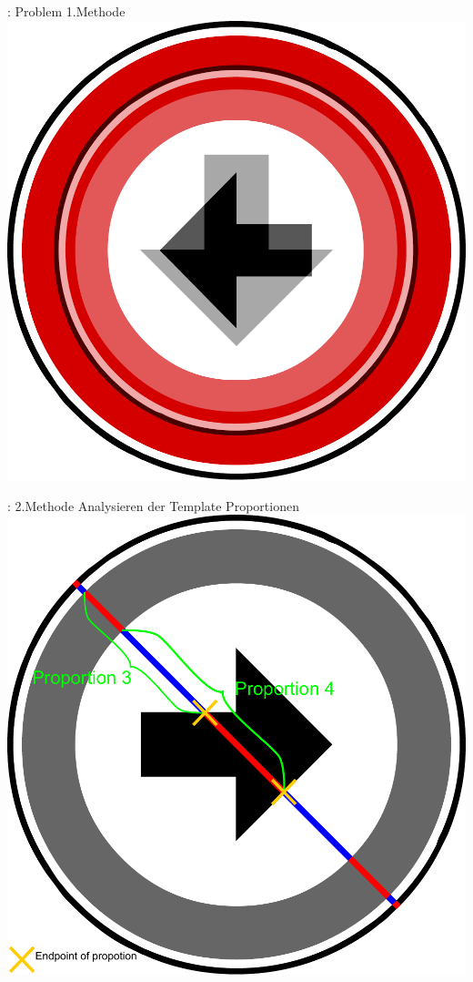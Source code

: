 \documentclass{VLKlauck}
\begin{document}
	\begin{frame}{\insertsubsection: Problem 1.Methode}
		  \includegraphics[scale=0.4]{robotSignProblem.pdf}
	\end{frame}
	\begin{frame}{\insertsubsection: 2.Methode}
		{Analysieren der Template Proportionen}
		\includegraphics[scale=0.35]{proportionGather.pdf}
	\end{frame}	
	
\end{document}
